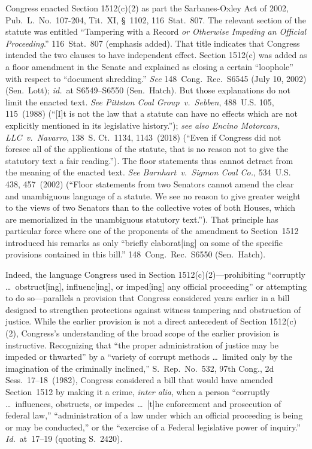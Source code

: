 Congress enacted Section 1512(c)(2) as part the Sarbanes-Oxley Act of 2002, Pub.\ L.~No.~107-204, Tit.~XI, \S~1102, 116~Stat.~807.
The relevant section of the statute was entitled ``Tampering with a Record \textit{or Otherwise Impeding an Official Proceeding}.''
116~Stat.~807 (emphasis added).
That title indicates that Congress intended the two clauses to have independent effect.
Section 1512(c) was added as a floor amendment in the Senate and explained as closing a certain ``loophole'' with respect to ``document shredding.''
\textit{See} 148~Cong.\ Rec.\ S6545 (July 10, 2002) (Sen.~Lott);
\textit{id.}~at S6549--S6550 (Sen.~Hatch).
But those explanations do not limit the enacted text.
\textit{See Pittston Coal Group~v.\ Sebben}, 488~U.S. 105, 115~(1988) (``[I]t is not the law that a statute can have no effects which are not explicitly mentioned in its legislative history.'');
\textit{see also Encino Motorcars, LLC~v.\ Navarro}, 138~S. Ct.~1134, 1143~(2018) (``Even if Congress did not foresee all of the applications of the statute, that is no reason not to give the statutory text a fair reading.'').
The floor statements thus cannot detract from the meaning of the enacted text.
\textit{See Barnhart~v.\ Sigmon Coal Co.}, 534~U.S. 438, 457~(2002) (``Floor statements from two Senators cannot amend the clear and unambiguous language of a statute.
We see no reason to give greater weight to the views of two Senators than to the collective votes of both Houses, which are memorialized in the unambiguous statutory text.'').
That principle has particular force where one of the proponents of the amendment to Section~1512 introduced his remarks as only ``briefly elaborat[ing] on some of the specific provisions contained in this bill.''
148~Cong.\ Rec.\ S6550 (Sen.~Hatch).

Indeed, the language Congress used in Section 1512(c)(2)---prohibiting ``corruptly \dots\ obstruct[ing], influenc[ing], or imped[ing] any official proceeding'' or attempting to do so---parallels a provision that Congress considered years earlier in a bill designed to strengthen protections against witness tampering and obstruction of justice.
While the earlier provision is not a direct antecedent of Section 1512(c)(2), Congress's understanding of the broad scope of the earlier provision is instructive.
Recognizing that ``the proper administration of justice may be impeded or thwarted'' by a ``variety of corrupt methods \dots\ limited only by the imagination of the criminally inclined,'' S.~Rep.\ No.~532, 97th Cong., 2d Sess.~17--18~(1982), Congress considered a bill that would have amended Section~1512 by making it a crime, \textit{inter alia}, when a person ``corruptly \dots\ influences, obstructs, or impedes \dots\ [t]he enforcement and prosecution of federal law,'' ``administration of a law under which an official proceeding is being or may be conducted,'' or the ``exercise of a Federal legislative power of inquiry.'' \textit{Id.}~at~17--19 (quoting S.~2420).

